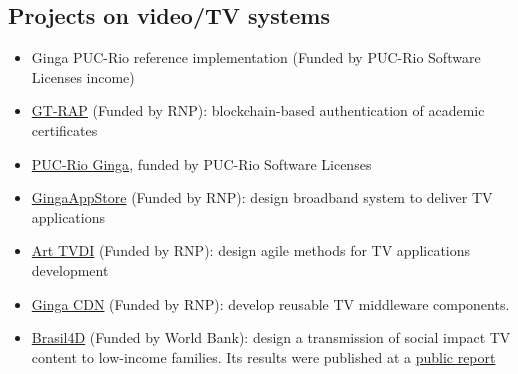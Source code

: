 \documentclass[10pt,a4paper,sans,colorlinks]{moderncv}
\begin{document}
  \subsection{Projects on video/TV systems}
    \begin{itemize}[mynosep]
      \item Ginga PUC-Rio reference implementation (Funded by PUC-Rio Software Licenses income)
      \item \href{http://wrnp.rnp.br/sites/wrnp2017/files/02_wrnp2017_poster_gt-sap_design.pdf}{GT-RAP} (Funded by RNP): blockchain-based authentication of academic certificates
      \item \href{https://github.com/TeleMidia/ginga}{PUC-Rio Ginga}, funded by PUC-Rio Software Licenses
      \item \href{http://www.redetic.rnp.br/ctic/2019/01/29/ginga-appstore/}{GingaAppStore} (Funded by RNP): design broadband system to deliver TV applications
      \item \href{http://www.redetic.rnp.br/ctic/2019/01/29/arttvdi/}{Art TVDI} (Funded by RNP): design agile methods for TV applications development
      \item \href{http://www.redetic.rnp.br/ctic/2019/01/29/gingarap-gingafrevo/}{Ginga CDN} (Funded by RNP): develop reusable TV middleware components.
      \item \href{http://www.ebc.com.br/brasil-4d}{Brasil4D} (Funded by World Bank): design a transmission of social impact TV content to low-income families. Its results were published at a \href{http://documents.worldbank.org/curated/en/232621468230956108/pdf/809560WP0PORTU0Box0379824B00PUBLIC0.pdf}{public report}
    \end{itemize}
\end{document}
